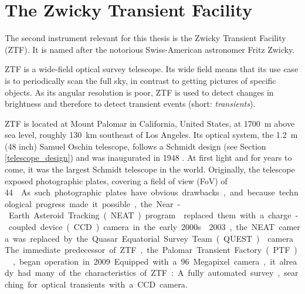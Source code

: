 \chapter{The Zwicky Transient Facility} \label{ztf}
The second instrument relevant for this thesis is the Zwicky Transient Facility (ZTF). It is named after the notorious Swiss-American astronomer Fritz Zwicky.

ZTF is a wide-field optical survey telescope. Its wide field means that its use case is to periodically scan the full sky, in contrast to getting pictures of specific objects. As its angular resolution is poor, ZTF is used to detect changes in brightness and therefore to detect transient events (short: \textit{transients}).

 ZTF is located at Mount Palomar in California, United States, at \SI{1700}{\m} above sea level, roughly \SI{130}{\km} southeast of Los Angeles. Its optical system, the \SI{1.2}{\m} (48 inch) Samuel Oschin telescope, follows a Schmidt design (see Section \ref{telescope_design}) and was inaugurated in 1948 \cite{Harrington1952}. At first light and for years to come, it was the largest Schmidt telescope in the world. Originally, the telescope exposed photographic plates, covering a field of view (FoV) of \SI{44}{\square\deg}. As such photographic plates have obvious drawbacks, and because technological progress made it possible, the Near-Earth Asteroid Tracking (NEAT) program  replaced them with a charge-coupled device (CCD) camera in the early 2000s.

2003, the NEAT camera was replaced by the Quasar Equatorial Survey Team (QUEST)  camera. The immediate predecessor of ZTF, the Palomar Transient Factory (PTF) , began operation in 2009. Equipped with a 96 Megapixel camera, it already had many of the characteristics of ZTF: A fully automated survey, searching for optical transients with a CCD camera.

